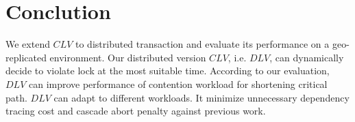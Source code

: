 \documentclass[conference]{IEEEtran}
\begin{document}
\section{Conclution}
\label{sec:conclution}
We extend $CLV$ to distributed transaction and evaluate its performance on a geo-replicated environment.
Our distributed version ${CLV}$, i.e. ${DLV}$, can dynamically decide to violate lock at the most suitable time.
According to our evaluation, ${DLV}$ can improve performance of contention workload for shortening critical path.
${DLV}$ can adapt to different workloads.
It minimize unnecessary dependency tracing cost and cascade abort penalty against previous work.








\end{document}
